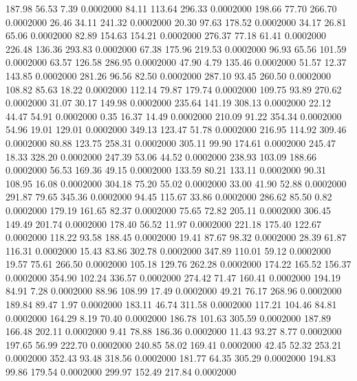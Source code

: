  187.98   56.53    7.39   0.0002000
  84.11  113.64  296.33   0.0002000
 198.66   77.70  266.70   0.0002000
  26.46   34.11  241.32   0.0002000
  20.30   97.63  178.52   0.0002000
  34.17   26.81   65.06   0.0002000
  82.89  154.63  154.21   0.0002000
 276.37   77.18   61.41   0.0002000
 226.48  136.36  293.83   0.0002000
  67.38  175.96  219.53   0.0002000
  96.93   65.56  101.59   0.0002000
  63.57  126.58  286.95   0.0002000
  47.90    4.79  135.46   0.0002000
  51.57   12.37  143.85   0.0002000
 281.26   96.56   82.50   0.0002000
 287.10   93.45  260.50   0.0002000
 108.82   85.63   18.22   0.0002000
 112.14   79.87  179.74   0.0002000
 109.75   93.89  270.62   0.0002000
  31.07   30.17  149.98   0.0002000
 235.64  141.19  308.13   0.0002000
  22.12   44.47   54.91   0.0002000
   0.35   16.37   14.49   0.0002000
 210.09   91.22  354.34   0.0002000
  54.96   19.01  129.01   0.0002000
 349.13  123.47   51.78   0.0002000
 216.95  114.92  309.46   0.0002000
  80.88  123.75  258.31   0.0002000
 305.11   99.90  174.61   0.0002000
 245.47   18.33  328.20   0.0002000
 247.39   53.06   44.52   0.0002000
 238.93  103.09  188.66   0.0002000
  56.53  169.36   49.15   0.0002000
 133.59   80.21  133.11   0.0002000
  90.31  108.95   16.08   0.0002000
 304.18   75.20   55.02   0.0002000
  33.00   41.90   52.88   0.0002000
 291.87   79.65  345.36   0.0002000
  94.45  115.67   33.86   0.0002000
 286.62   85.50    0.82   0.0002000
 179.19  161.65   82.37   0.0002000
  75.65   72.82  205.11   0.0002000
 306.45  149.49  201.74   0.0002000
 178.40   56.52   11.97   0.0002000
 221.18  175.40  122.67   0.0002000
 118.22   93.58  188.45   0.0002000
  19.41   87.67   98.32   0.0002000
  28.39   61.87  116.31   0.0002000
  15.43   83.86  302.78   0.0002000
 347.89  110.01   59.12   0.0002000
  19.57   75.61  266.50   0.0002000
 105.18  129.76  262.28   0.0002000
 174.22  165.52  156.37   0.0002000
 354.90  102.24  336.57   0.0002000
 274.42   71.47  160.41   0.0002000
 194.19   84.91    7.28   0.0002000
  88.96  108.99   17.49   0.0002000
  49.21   76.17  268.96   0.0002000
 189.84   89.47    1.97   0.0002000
 183.11   46.74  311.58   0.0002000
 117.21  104.46   84.81   0.0002000
 164.29    8.19   70.40   0.0002000
 186.78  101.63  305.59   0.0002000
 187.89  166.48  202.11   0.0002000
   9.41   78.88  186.36   0.0002000
  11.43   93.27    8.77   0.0002000
 197.65   56.99  222.70   0.0002000
 240.85   58.02  169.41   0.0002000
  42.45   52.32  253.21   0.0002000
 352.43   93.48  318.56   0.0002000
 181.77   64.35  305.29   0.0002000
 194.83   99.86  179.54   0.0002000
 299.97  152.49  217.84   0.0002000
